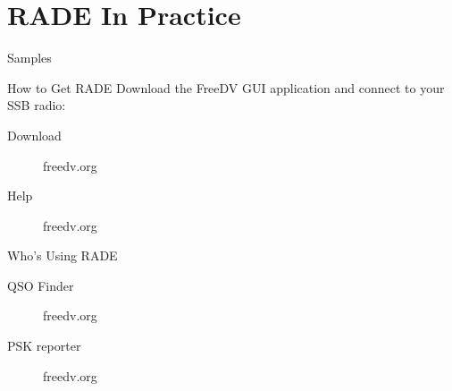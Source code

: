 \documentclass{beamer}
\begin{document}
\section{RADE In Practice}
\begin{frame}{Samples}
\end{frame} 
\begin{frame}{How to Get RADE}
Download the FreeDV GUI application and connect to your SSB radio:
\begin{description}
    \item[Download] freedv.org
    \item[Help] freedv.org
\end{description}\end{frame} 
\begin{frame}{Who's Using RADE}
\begin{description}
    \item[QSO Finder] freedv.org
    \item[PSK reporter] freedv.org
\end{description}
\end{frame} 
\end{document}

